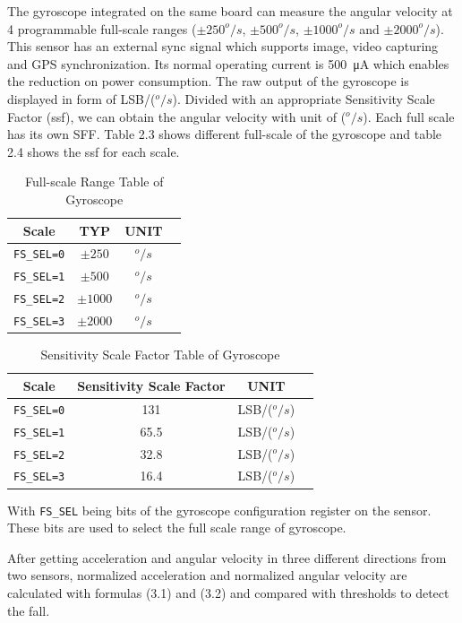 \documentclass[letterpaper,12pt,titlepage,oneside,final]{book}
\begin{document}
 The gyroscope integrated on the same board can measure the angular velocity at 4 programmable full-scale ranges ($\pm250^{o}/s$, $\pm500^{o}/s$, $\pm1000^{o}/s$ and $\pm2000^{o}/s$). This sensor has an external sync signal which supports image, video capturing and GPS synchronization. Its normal operating current is \SI{500}{\micro\ampere} which enables the reduction on power consumption. The raw output of the gyroscope is displayed in form of LSB/($^{o}/s$). Divided with an appropriate Sensitivity Scale Factor (\gls{ssf}), we can obtain the angular velocity with unit of ($^{o}/s$). Each full scale has its own SFF. Table 2.3 shows different full-scale of the gyroscope and table 2.4 shows the \gls{ssf} for each scale. 
\begin{table}[h!]
	\begin{center}
		\begin{tabular}{ |c|c|c|c| } 
			\hline
			Scale & TYP & UNIT \\
			\hline
			\verb|FS_SEL=0| & $\pm250$ & $^{o}/s$\\ 
			\verb|FS_SEL=1|& $\pm500$ & $^{o}/s$ \\ 
			\verb|FS_SEL=2|& $\pm1000$ & $^{o}/s$ \\
			\verb|FS_SEL=3|& $\pm2000$ & $^{o}/s$\\
			\hline
		\end{tabular}
		\caption{Full-scale Range Table of Gyroscope}
		\label{table:1}
	\end{center}
\end{table}
\begin{table}[h!]
	\begin{center}
		\begin{tabular}{ |c|c|c|c| } 
			\hline
			Scale & Sensitivity Scale Factor & UNIT \\
			\hline
			\verb|FS_SEL=0| & 131 & LSB/($^{o}/s$) \\ 
			\verb|FS_SEL=1|& 65.5 & LSB/($^{o}/s$) \\ 
			\verb|FS_SEL=2|& 32.8 & LSB/($^{o}/s$) \\
			\verb|FS_SEL=3|& 16.4 & LSB/($^{o}/s$)\\
			\hline
		\end{tabular}
		\caption{Sensitivity Scale Factor Table of Gyroscope}
		\label{table:1}
	\end{center}
\end{table}
\newpage
With \verb|FS_SEL| being bits of the gyroscope configuration register on the sensor. These bits are used to select the full scale range of gyroscope. \par 
After getting acceleration and angular velocity in three different directions from two sensors, normalized acceleration and normalized angular velocity are calculated with formulas (3.1) and (3.2) and compared with thresholds to detect the fall. 
\end{document}
